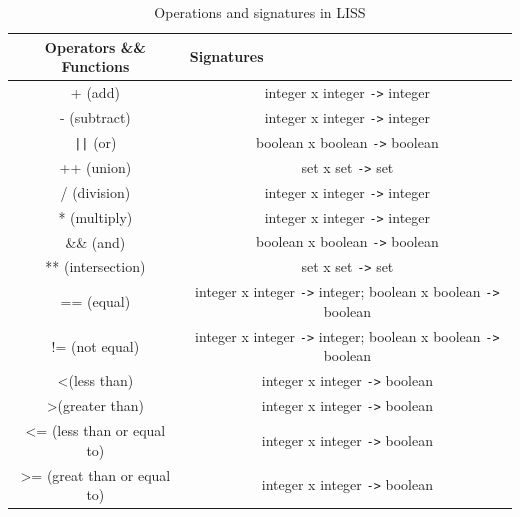 \documentclass[
  oneside,
  11pt, a4paper,
  footinclude=true,
  headinclude=true,
  cleardoublepage=empty
]{scrbook}
\begin{document}
\begin{table}[]
\centering
\caption{Operations and signatures in LISS}
\label{tbl:type_operations}
\begin{tabular}{|c|c|}
\hline
\textbf{Operators \&\& Functions} & \multicolumn{1}{l|}{\textbf{Signatures}} \\ \hline
+ (add)                                   & integer x integer \verb+->+ integer                                        \\ \hline
- (subtract)                              & integer x integer \verb+->+ integer                                        \\ \hline
\verb+||+ (or)                            & boolean x boolean  \verb+->+ boolean                                       \\ \hline
++ (union)                                & set x set \verb+->+ set                                                    \\ \hline
/ (division)                              & integer x integer \verb+->+ integer                                        \\ \hline
* (multiply)                              & integer x integer \verb+->+ integer                                        \\ \hline
\&\& (and)                                & boolean x boolean \verb+->+ boolean                                        \\ \hline
** (intersection)                         & set x set \verb+->+ set                                                    \\ \hline
== (equal)                                & integer x integer \verb+->+ integer; boolean x boolean \verb+->+ boolean   \\ \hline
!= (not equal)                            & integer x integer \verb+->+ integer; boolean x boolean \verb+->+ boolean   \\ \hline
\textless  (less than)                    & integer x integer \verb+->+ boolean                                        \\ \hline
\textgreater  (greater than)              & integer x integer \verb+->+ boolean                                        \\ \hline
\textless= (less than or equal to)        & integer x integer \verb+->+ boolean                                        \\ \hline
\textgreater= (great than or equal to)    & integer x integer \verb+->+ boolean                                        \\ \hline

\end{tabular}
\end{table}
\end{document}
